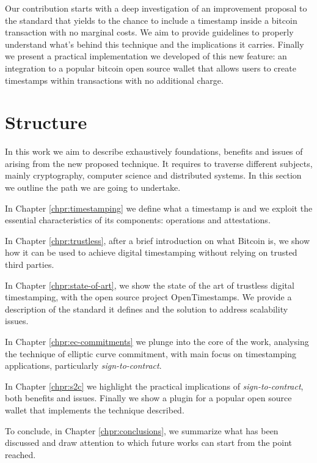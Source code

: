 Our contribution starts with a deep investigation of an improvement proposal \cite{PoePR, PoeIs} to the standard that yields to the chance to include a timestamp inside a bitcoin transaction with no marginal costs. 
We aim to provide guidelines to properly understand what's behind this technique and the implications it carries.
Finally we present a practical implementation we developed of this new feature: an integration to a popular bitcoin open source wallet that allows users to create timestamps within transactions with no additional charge. 

\section{Structure}
In this work we aim to describe exhaustively foundations, benefits and issues of arising from the new proposed technique. 
It requires to traverse different subjects, mainly cryptography, computer science and distributed systems.
In this section we outline the path we are going to undertake.

In Chapter \ref{chpr:timestamping} we define what a timestamp is and we exploit the essential characteristics of its components: operations and attestations.

In Chapter \ref{chpr:trustless}, after a brief introduction on what Bitcoin is, we show how it can be used to achieve digital timestamping without relying on trusted third parties.

In Chapter \ref{chpr:state-of-art}, we show the state of the art of trustless digital timestamping, with the open source project OpenTimestamps. 
We provide a description of the standard it defines and the solution to address scalability issues.

In Chapter \ref{chpr:ec-commitments} we plunge into the core of the work, analysing the technique of elliptic curve commitment, with main focus on timestamping applications, particularly \textit{sign-to-contract}.

In Chapter \ref{chpr:s2c} we highlight the practical implications of \textit{sign-to-contract}, both benefits and issues. Finally we show a plugin for a popular open source wallet that implements the technique described.

To conclude, in Chapter \ref{chpr:conclusions}, we summarize what has been discussed and draw attention to which future works can start from the point reached.